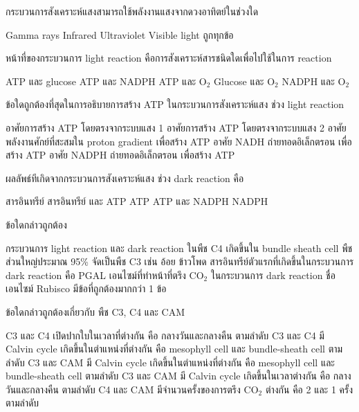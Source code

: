 \documentclass[12pt, a4paper]{exam}
\begin{document}
\begin{questions}
\filbreak
  \question กระบวนการสังเคราะห์แสงสามารถใช้พลังงานแสงจากดวงอาทิตย์ในช่วงใด
  \begin{choices}
    \choice Gamma rays
    \choice Infrared
    \choice Ultraviolet
    \choice Visible light
    \choice ถูกทุกข้อ
\end{choices}

\filbreak
  \question หน้าที่ของกระบวนการ light reaction คือการสังเคราะห์สารชนิดใดเพื่อไปใช้ในการ reaction
  \begin{choices}
    \choice ATP และ glucose
    \choice ATP และ NADPH
    \choice ATP และ O$_2$
    \choice Glucose และ O$_2$
    \choice NADPH และ O$_2$
\end{choices}

\filbreak
  \question ข้อใดถูกต้องที่สุดในการอธิบายการสร้าง ATP ในกระบวนการสังเคราะห์แสง ช่วง light reaction
  \begin{choices}
    \choice อาศัยการสร้าง ATP โดยตรงจากระบบแสง 1
    \choice อาศัยการสร้าง ATP โดยตรงจากระบบแสง 2
    \choice อาศัยพลังงานศักย์ที่สะสมใน proton gradient เพื่อสร้าง ATP
    \choice อาศัย NADH ถ่ายทอดอิเล็กตรอน เพื่อสร้าง ATP
    \choice อาศัย NADPH ถ่ายทอดอิเล็กตรอน เพื่อสร้าง ATP
\end{choices}

\filbreak
  \question ผลลัพธ์ทีเกิดจากกระบวนการสังเคราะห์แสง ช่วง dark reaction คือ
  \begin{choices}
    \choice สารอินทรีย์
    \choice สารอินทรีย์ และ ATP
    \choice ATP
    \choice ATP และ NADPH
    \choice NADPH
\end{choices}

\filbreak
  \question ข้อใดกล่าวถูกต้อง
  \begin{choices}
    \choice กระบวนการ light reaction และ dark reaction ในพืช C4 เกิดขึ้นใน bundle sheath cell
    \choice พืชส่วนใหญ่ประมาณ 95\% จัดเป็นพืช C3 เช่น อ้อย ข้าวโพด
    \choice สารอินทรีย์ตัวแรกที่เกิดขึ้นในกระบวนการ dark reaction คือ PGAL
    \choice เอนไซม์ที่ทำหน้าที่ตรึง CO$_2$ ในกระบวนการ dark reaction ชื่อ เอนไซม์ Rubisco
    \choice มีข้อที่ถูกต้องมากกว่า 1 ข้อ
\end{choices}

\filbreak
  \question ข้อใดกล่าวถูกต้องเกี่ยวกับ พืช C3, C4 และ CAM
  \begin{choices}
    \choice C3 และ C4 เปิดปากใบในเวลาที่ต่างกัน คือ กลางวันและกลางคืน ตามลำดับ
    \choice C3 และ C4 มี Calvin cycle เกิดขึ้นในตำแหน่งที่ต่างกัน คือ mesophyll cell และ bundle-sheath cell ตามลำดับ
    \choice C3 และ CAM มี Calvin cycle เกิดขึ้นในตำแหน่งที่ต่างกัน คือ mesophyll cell และ bundle-sheath cell ตามลำดับ
    \choice C3 และ CAM มี Calvin cycle เกิดขึ้นในเวลาต่างกัน คือ กลางวันและกลางคืน ตามลำดับ
    \choice C4 และ CAM มีจำนวนครั้งของการตรึง CO$_2$ ต่างกัน คือ 2 และ 1 ครั้ง ตามลำดับ
\end{choices}


\end{questions}
\end{document}
